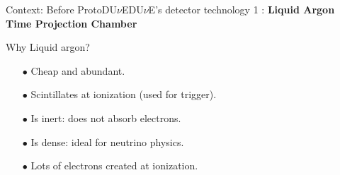 \documentclass[10pt]{beamer}
\begin{document}
\begin{frame}{Context: Before \texorpdfstring{ProtoDU$\nu$E}{ProtoDUNE}}{DU$\nu$E's detector technology 1 : \textbf{Liquid Argon Time Projection Chamber}}
\begin{scriptsize}
\begin{minipage}{0.48\textwidth}
    			Why Liquid argon?
    			\begin{itemize}
    				\item[$\bullet$] Cheap and abundant.
    				\item[$\bullet$] Scintillates at ionization (used for trigger).
    				\item[$\bullet$] Is inert: does not absorb electrons.
    				\item[$\bullet$] Is dense: ideal for neutrino physics.
    				\item[$\bullet$] Lots of electrons created at ionization.
    			\end{itemize}
    		\end{minipage}
    	\end{scriptsize}
    \end{frame}
    
\end{document}
